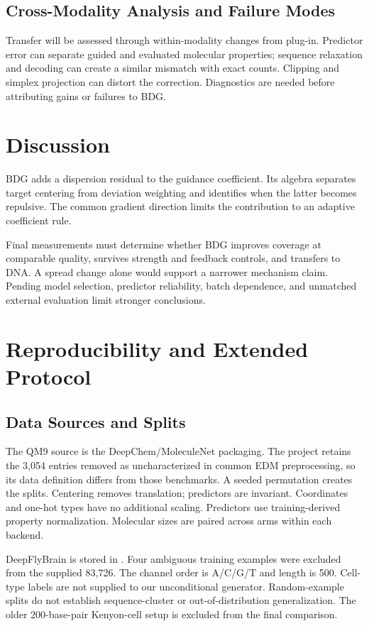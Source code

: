 \documentclass{article}
\begin{document}
\subsection{Cross-Modality Analysis and Failure Modes}\label{sec:failure}
Transfer will be assessed through within-modality changes from plug-in. Predictor error can separate guided and evaluated molecular properties; sequence relaxation and decoding can create a similar mismatch with exact counts. Clipping and simplex projection can distort the correction. Diagnostics are needed before attributing gains or failures to BDG.

\section{Discussion}
BDG adds a dispersion residual to the guidance coefficient. Its algebra separates target centering from deviation weighting and identifies when the latter becomes repulsive. The common gradient direction limits the contribution to an adaptive coefficient rule.

Final measurements must determine whether BDG improves coverage at comparable quality, survives strength and feedback controls, and transfers to DNA. A spread change alone would support a narrower mechanism claim. Pending model selection, predictor reliability, batch dependence, and unmatched external evaluation limit stronger conclusions.
\clearpage


\clearpage
\appendix
\section{Reproducibility and Extended Protocol}
\subsection{Data Sources and Splits}\label{app:data}
The QM9 source is the DeepChem/MoleculeNet packaging. The project retains the 3{,}054 entries removed as uncharacterized in common EDM preprocessing, so its data definition differs from those benchmarks. A seeded permutation creates the splits. Centering removes translation; predictors are invariant. Coordinates and one-hot types have no additional scaling. Predictors use training-derived property normalization. Molecular sizes are paired across arms within each backend.

DeepFlyBrain is stored in . Four ambiguous training examples were excluded from the supplied 83{,}726. The channel order is A/C/G/T and length is 500. Cell-type labels are not supplied to our unconditional generator. Random-example splits do not establish sequence-cluster or out-of-distribution generalization. The older 200-base-pair Kenyon-cell setup is excluded from the final comparison.
\end{document}
